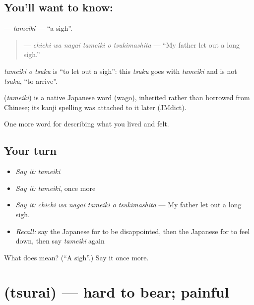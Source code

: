 \subsection*{You'll want to know: }
\textbf{} — \emph{tameiki} — \textquotedblleft{}a sigh\textquotedblright{}.

\begin{quote}
\textbf{   } — \emph{chichi wa nagai tameiki o tsukimashita} — \textquotedblleft{}My father let out a long sigh.\textquotedblright{}
\end{quote}

\emph{tameiki o tsuku} is \textquotedblleft{}to let out a sigh\textquotedblright{}: this \emph{tsuku} goes with \emph{tameiki} and is not \emph{tsuku}, \textquotedblleft{}to arrive\textquotedblright{}.

\begin{cousinweb}
\textbf{} (\emph{tameiki}) is a native Japanese word (wago), inherited rather than borrowed from Chinese; its kanji spelling was attached to it later (JMdict).
\end{cousinweb}

\begin{grammarlens}[title={What you've built}]
One more word for describing what you lived and felt.
\end{grammarlens}

\subsection*{Your turn}
\begin{itemize}
\raggedright
  \item \emph{Say it:} \emph{tameiki}
  \item \emph{Say it:} \emph{tameiki}, once more
  \item \emph{Say it:} \emph{chichi wa nagai tameiki o tsukimashita} — My father let out a long sigh.
  \item \emph{Recall:} say the Japanese for to be disappointed, then the Japanese for to feel down, then say \emph{tameiki} again
\end{itemize}

\begin{tcolorbox}[breakable,colback=teal!4,colframe=teal!35!black,title={Before you move on}]
What does  mean? (\textquotedblleft{}A sigh\textquotedblright{}.) Say it once more.
\end{tcolorbox}
\section[\texorpdfstring{\ja{つらい} (tsurai)}{つらい (tsurai)}]{ (tsurai) — hard to bear; painful}

